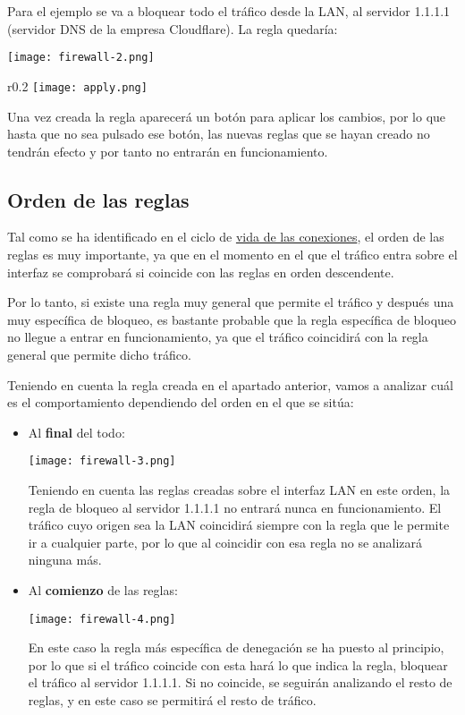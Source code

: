 Para el ejemplo se va a bloquear todo el tráfico desde la LAN, al servidor 1.1.1.1 (servidor DNS de la empresa Cloudflare). La regla quedaría:

\begin{center}
    \texttt{[image: firewall-2.png]}
\end{center}


\begin{wrapfigure}{r}{0.2\linewidth}
    \centering
    \vspace{-10pt}
    \texttt{[image: apply.png]}
\end{wrapfigure}
Una vez creada la regla aparecerá un botón para aplicar los cambios, por lo que hasta que no sea pulsado ese botón, las nuevas reglas que se hayan creado no tendrán efecto y por tanto no entrarán en funcionamiento.


\subsection{Orden de las reglas}
Tal como se ha identificado en el ciclo de \hyperlink{ciclo_vida_conexiones}{vida de las conexiones}, el orden de las reglas es muy importante, ya que en el momento en el que el tráfico entra sobre el interfaz se comprobará si coincide con las reglas en orden descendente.

Por lo tanto, si existe una regla muy general que permite el tráfico y después una muy específica de bloqueo, es bastante probable que la regla específica de bloqueo no llegue a entrar en funcionamiento, ya que el tráfico coincidirá con la regla general que permite dicho tráfico.

Teniendo en cuenta la regla creada en el apartado anterior, vamos a analizar cuál es el comportamiento dependiendo del orden en el que se sitúa:

\begin{itemize}
    \item Al \textbf{final} del todo:
    \begin{center}
        \texttt{[image: firewall-3.png]}
    \end{center}
    Teniendo en cuenta las reglas creadas sobre el interfaz LAN en este orden, la regla de bloqueo al servidor 1.1.1.1 no entrará nunca en funcionamiento. El tráfico cuyo origen sea la LAN coincidirá siempre con la regla que le permite ir a cualquier parte, por lo que al coincidir con esa regla no se analizará ninguna más.

    \item Al \textbf{comienzo} de las reglas:
    \begin{center}
        \texttt{[image: firewall-4.png]}
    \end{center}
    En este caso la regla más específica de denegación se ha puesto al principio, por lo que si el tráfico coincide con esta hará lo que indica la regla, bloquear el tráfico al servidor 1.1.1.1. Si no coincide, se seguirán analizando el resto de reglas, y en este caso se permitirá el resto de tráfico.
\end{itemize}

